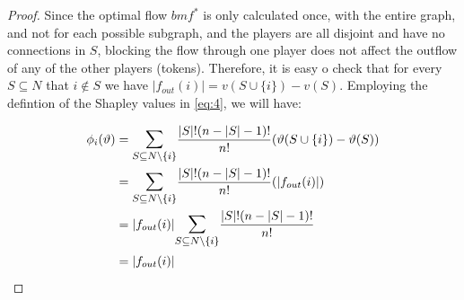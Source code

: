 \documentclass{article} %
\theoremstyle{bfnote}
\begin{document}
\begin{proof}
	Since the optimal flow $bm{f}^{\ast}$ is only calculated once, with the entire graph, and not for each possible subgraph, and the players are all disjoint and have no connections in $S$, blocking the flow through one player does not affect the outflow of any of the other players (tokens).
	Therefore, it is easy o check that for every $S \subseteq N$ that $i \notin S$  we have  $|f_{out}(i)| = v(S \cup\{i\})-v(S)$. Employing the defintion of the Shapley values in \cref{eq:4}, we will have:
	
	\begin{equation*}
		\begin{aligned}
			\phi_i(\vartheta) & =\mathlarger{\sum\limits_{S \subseteq N \backslash\{i\}}} \frac{|S| !(n-|S|-1) !}{n !}(\vartheta(S \cup\{i\})-\vartheta(S)) \\
			& =\mathlarger{\sum\limits_{S \subseteq N \backslash\{i\}}} \frac{|S| !(n-|S|-1) !}{n !}(|f_{out}(i)|) \\
			& = |f_{out}(i)|\mathlarger{\sum\limits_{S \subseteq N \backslash\{i\}}} \frac{|S| !(n-|S|-1) !}{n!} \\
			& = |f_{out}(i)|
		\end{aligned}
	\end{equation*}
\end{proof}
\end{document}
